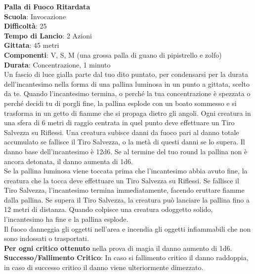 \begin{multicols}{2}
\medskip\textbf{Palla di Fuoco Ritardata}\\
\textbf{Scuola}: Invocazione\\
\textbf{Difficoltà}:  25\\
\textbf{Tempo di Lancio}: 2 Azioni\\
\textbf{Gittata}: 45 metri\\
\textbf{Componenti}: V, S, M (una grossa palla di guano di pipistrello e zolfo)\\
\textbf{Durata}: Concentrazione, 1 minuto\\
Un fascio di luce gialla parte dal tuo dito puntato, per condensarsi per la durata dell'incantesimo nella forma di una pallina luminosa in un punto a gittata, scelto da te. Quando l'incantesimo termina, o perché la tua concentrazione è spezzata o perché decidi tu di porgli fine, la pallina esplode con un boato sommesso e si  trasforma in un getto di fiamme che si propaga dietro gli angoli. Ogni creatura in una sfera di 6 metri di raggio centrata in quel punto deve effettuare un Tiro Salvezza su Riflessi. Una creatura subisce danni da fuoco pari al danno totale accumulato se fallisce il Tiro Salvezza, o la metà di questi danni se lo supera. Il danno base dell'incantesimo è 12d6. Se al termine del tuo round la pallina non è ancora detonata, il danno aumenta di 1d6.\\
Se la pallina luminosa viene toccata prima che l'incantesimo abbia avuto fine, la creatura che la tocca deve effettuare un Tiro Salvezza su Riflessi. Se fallisce il Tiro Salvezza, l'incantesimo termina immediatamente, facendo eruttare fiamme dalla pallina. Se supera il Tiro Salvezza, la creatura può lanciare la pallina fino a 12 metri di distanza. Quando colpisce una creatura odoggetto  solido, l'incantesimo ha fine e la pallina esplode.\\
Il fuoco danneggia gli oggetti nell'area e incendia gli oggetti infiammabili che non sono indossati o trasportati.\\
\textbf{Per ogni critico ottenuto} nella prova di magia il danno aumento di 1d6.\\
\textbf{Successo/Fallimento Critico}: In caso si fallimento critico il danno raddoppia, in caso di successo critico il danno viene ulteriormente dimezzato.


\end{multicols}
